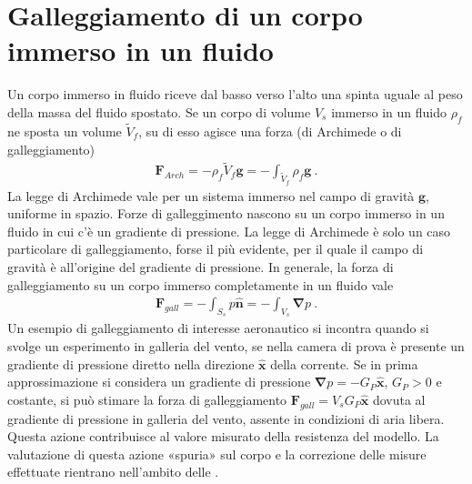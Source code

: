 \documentclass[letterpaper,10pt,italian]{jupyterBook}
\begin{document}
\section{Galleggiamento di un corpo immerso in un fluido}
\label{\detokenize{polimi/fluidmechanics-ita/template/capitoli/01_statica/02teoria:galleggiamento-di-un-corpo-immerso-in-un-fluido}}\label{\detokenize{polimi/fluidmechanics-ita/template/capitoli/01_statica/02teoria:fluid-mechanics-statics-buoyancy}}
\sphinxAtStartPar
Un corpo immerso in fluido riceve dal basso verso l’alto una spinta
uguale al peso della massa del fluido spostato. Se un corpo di volume
\(V_s\) immerso in un fluido \(\rho_f\) ne sposta un volume \(\tilde{V}_f\),
su di esso agisce una forza (di Archimede o di galleggiamento)
\begin{equation*}
\begin{split}\mathbf{F}_{Arch} = - \rho_f \tilde{V}_f \mathbf{g} = - \int_{\tilde{V}_f} \rho_f \mathbf{g} \ .\end{split}
\end{equation*}
\sphinxAtStartPar
La legge di Archimede vale per un sistema immerso nel campo di gravità
\(\mathbf{g}\), uniforme in spazio. Forze di galleggimento nascono su un corpo
immerso in un fluido in cui c’è un gradiente di pressione. La legge di
Archimede è solo un caso particolare di galleggiamento, forse il più
evidente, per il quale il campo di gravità è all’origine del gradiente
di pressione. In generale, la forza di galleggiamento su un corpo
immerso completamente in un fluido vale
\begin{equation*}
\begin{split}\mathbf{F}_{gall} = -\int_{S_s} p \mathbf{\hat{n}} = - \int_{V_s} \mathbf{\nabla} p \ .\end{split}
\end{equation*}
\sphinxAtStartPar
Un esempio di galleggiamento di interesse aeronautico si incontra quando
si svolge un esperimento in galleria del vento, se nella camera di prova
è presente un gradiente di pressione diretto nella direzione
\(\mathbf{\hat{x}}\) della corrente. Se in prima approssimazione si considera
un gradiente di pressione \(\mathbf{\nabla}p = - G_P \mathbf{\hat{x}}\), \(G_P>0\) e
costante, si può stimare la forza di galleggiamento
\(\mathbf{F}_{gall} = V_s G_P \mathbf{\hat{x}}\) dovuta al gradiente di pressione
in galleria del vento, assente in condizioni di aria libera. Questa
azione contribuisce al valore misurato della resistenza del modello. La
valutazione di questa azione «spuria» sul corpo e la correzione delle
misure effettuate rientrano nell’ambito delle .
\end{document}
